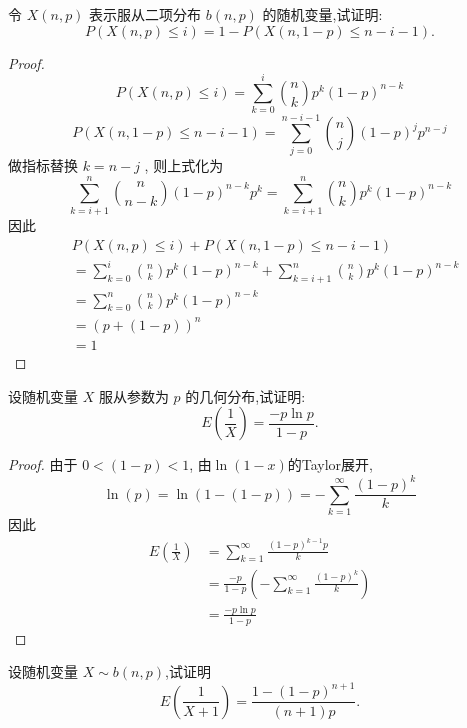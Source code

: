 \documentclass[../main.tex]{subfiles}
\begin{document}
\begin{exercise}{}{}
令 $X(n,p)$ 表示服从二项分布 $b(n,p)$ 的随机变量,试证明:
\[
P(X(n,p) \leq i) = 1 - P(X(n,1-p) \leq n-i-1).
\]
\end{exercise}
\begin{proof}
      \[
  P\left( X\left( n,p \right)\le i  \right)= \sum _{ k= 0}^{i}\binom{ n }{k }p^{k}\left( 1-p \right)^{n-k}   
  \] \[
  P\left( X\left( n,1-p \right)\le n-i-1  \right)= \sum _{ j= 0}^{n-i-1}\binom{ n}{j }\left( 1-p \right)^{j}p ^{n-j} 
  \]做指标替换 \(  k=n-j \) , 则上式化为 \[
  \sum _{k= i+ 1}^{n}\binom{ n }{n-k  } \left( 1-p \right)^{n-k}p^{k} = \sum _{k= i+ 1}^{n}\binom{ n }{k  }p^{k}\left( 1-p \right)^{n-k}  
  \]因此 \[
  \begin{aligned}
  &P\left( X\left( n,p \right)\le i  \right)+ P\left( X\left( n,1-p \right)\le n-i-1  \right)   \\ 
   &=  \sum _{k = 0}^{i}\binom{ n }{k  }p^{k}\left( 1-p \right)^{n-k}  + \sum _{k= i+ 1}^{n}\binom{ n }{k  }p^{k}\left( 1-p \right)^{n-k}\\ 
    &= \sum _{k = 0}^{n}\binom{ n }{k  }p^{k}\left( 1-p \right)^{n-k}\\
    &= \left( p+ \left( 1-p \right)  \right)^{n}\\ 
     &= 1     
  \end{aligned}
  \]
\end{proof}
\begin{exercise}{}{}
设随机变量 $X$ 服从参数为 $p$ 的几何分布,试证明:
\[
E\left(\frac{1}{X}\right) = \frac{-p\ln p}{1-p}.
\]
\end{exercise}
\begin{proof}
     由于 \(  0< \left( 1-p \right)< 1   \),  由$\ln(1-x)$的Taylor展开,  \[
      \ln \left( p \right)=\ln \left( 1-\left( 1-p \right)  \right)=   -\sum _{k = 1}^{\infty} \frac{\left( 1-p \right)^{k}  }{k} 
      \]因此 \[
     \begin{aligned}
      E\left( \frac{1 }{X }  \right)&= \sum _{k = 1}^{\infty}\frac{\left( 1-p \right)^{k-1}p  }{k }\\ 
       &= \frac{-p }{1-p }\left( - \sum _{k= 1}^{\infty}\frac{\left( 1-p \right)^{k}  }{k }  \right)\\ 
        &= \frac{-p\ln p }{1-p }     
     \end{aligned} 
      \]
\end{proof}
\begin{exercise}{}{}
设随机变量 $X \sim b(n,p)$,试证明
\[
E\left(\frac{1}{X+1}\right) = \frac{1-(1-p)^{n+1}}{(n+1)p}.
\]
\end{exercise}
\end{document}
